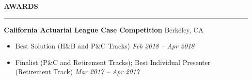 \documentclass[11pt,letterpaper]{article}
\newcommand{\sectline}{\vspace{4pt}\hrule height 1.5pt\vspace{4pt}}
\newcommand{\sectspace}{\vspace{10pt}}
\newcommand{\smallspace}{\vspace{5pt}}
\begin{document}
\textbf{AWARDS} \sectline
\textbf{California Actuarial League Case Competition} \hfill Berkeley, CA \\
\begin{itemize}
\item Best Solution (H\&B and P\&C Tracks) \hfill \textit{Feb 2018 -- Apr 2018} \\
\item Finalist (P\&C and Retirement Tracks); Best Individual Presenter (Retirement Track) \hfill \textit{Mar 2017 -- Apr 2017}
\end{itemize}

\sectspace
\end{document}
